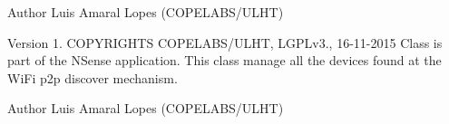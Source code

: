 \begin{DoxyAuthor}{Author}
Luis Amaral Lopes (C\-O\-P\-E\-L\-A\-B\-S/\-U\-L\-H\-T)
\end{DoxyAuthor}
\begin{DoxyVersion}{Version}
1. C\-O\-P\-Y\-R\-I\-G\-H\-T\-S C\-O\-P\-E\-L\-A\-B\-S/\-U\-L\-H\-T, L\-G\-P\-Lv3., 16-\/11-\/2015 Class is part of the N\-Sense application. This class manage all the devices found at the Wi\-Fi p2p discover mechanism. 
\end{DoxyVersion}
\begin{DoxyAuthor}{Author}
Luis Amaral Lopes (C\-O\-P\-E\-L\-A\-B\-S/\-U\-L\-H\-T) 
\end{DoxyAuthor}
